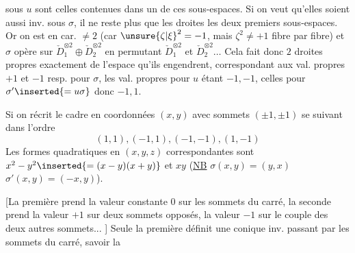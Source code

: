 sous $u$ sont celles contenues dans un de ces sous-espaces. Si on veut qu'elles soient aussi inv. sous $\sigma$, il ne reste plus que les droites  les deux premiers sous-espaces. Or on est en car. $\ne2$ (car ${\unsure{\zeta|\xi}}^2=-1$, mais $\zeta^2\ne+1$ fibre par fibre) et $\sigma$ opère sur $\check D_1^{\otimes2}\oplus\check D_2^{\otimes2}$ en permutant $\check D_1^{\otimes2}$ et $\check D_2^{\otimes2}\ldots$ Cela fait donc $2$ droites propres exactement de l'espace qu'ils engendrent, correspondant aux val. propres $+1$ et $-1$ resp. pour $\sigma$, les val. propres pour $u$ étant $-1,-1$, celles pour $\sigma'\inserted{=u\sigma}$  donc $-1,1$.

Si on  récrit le cadre en coordonnées $(x,y)$ avec sommets $(\pm1,\pm1)$  se suivant dans l'ordre
\[
(1,1),(-1,1),(-1,-1),(1,-1)
\]
Les formes quadratiques en $(x,y,z)$ correspondantes sont $x^2-y^2\inserted{=(x-y)(x+y)}$ et $xy$ (\uline{NB} $\sigma(x,y)=(y,x)$ $\sigma'(x,y)=(-x,y)$).

 [La première prend la valeur constante $0$ sur les sommets du carré, la seconde prend la valeur $+1$ sur  deux sommets opposés, la valeur $-1$ sur le couple des deux autres sommets... ] Seule la première définit une conique inv. passant par les sommets du carré, savoir la
